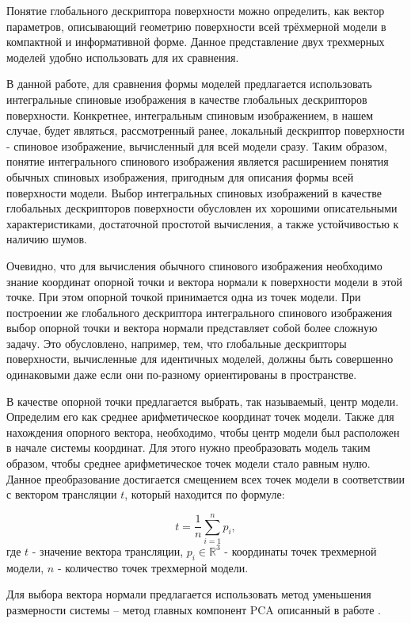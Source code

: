 \documentclass[14pt]{article}
\numberwithin{figure}{section}
\numberwithin{equation}{section}
\begin{document}
Понятие глобального дескриптора поверхности можно определить, как вектор параметров, описывающий геометрию поверхности всей трёхмерной модели в компактной и информативной форме. Данное представление двух трехмерных моделей удобно использовать для их сравнения.

В данной работе, для сравнения формы моделей предлагается использовать интегральные спиновые изображения в качестве глобальных дескрипторов поверхности. Конкретнее, интегральным спиновым изображением, в нашем случае, будет являться, рассмотренный ранее, локальный дескриптор поверхности - спиновое изображение, вычисленный для всей модели сразу. Таким образом, понятие интегрального спинового изображения является расширением понятия обычных спиновых изображения, пригодным для описания формы всей поверхности модели.
Выбор интегральных спиновых изображений в качестве глобальных дескрипторов поверхности обусловлен их хорошими описательными характеристиками, достаточной простотой вычисления, а также устойчивостью к наличию шумов.

Очевидно, что для вычисления обычного спинового изображения необходимо знание координат опорной точки и вектора нормали к поверхности модели в этой точке. При этом опорной точкой принимается одна из точек модели. При построении же глобального дескриптора интегрального спинового изображения выбор опорной точки и вектора нормали представляет собой более сложную задачу. Это обусловлено, например, тем, что глобальные дескрипторы поверхности, вычисленные для идентичных моделей, должны быть совершенно одинаковыми даже если они по-разному ориентированы в пространстве.

В качестве опорной точки предлагается выбрать, так называемый, центр модели. Определим его как среднее арифметическое координат точек модели. Также для нахождения опорного вектора, необходимо, чтобы центр модели был расположен в начале системы координат. Для этого нужно преобразовать модель таким образом, чтобы среднее арифметическое точек модели стало равным нулю. Данное преобразование достигается смещением всех точек модели в соответствии с вектором трансляции $t$, который находится по формуле:

\begin{equation}
	t = \frac{1}{n}\sum\limits^{n}_{i = 1} p_i,
\end{equation}
где $t$ - значение вектора трансляции, $p_i \in \mathbb{R}^3$ - координаты точек трехмерной модели, $n$ - количество точек трехмерной модели.

Для выбора вектора нормали предлагается использовать метод уменьшения размерности системы – метод главных компонент PCA описанный в работе \cite{Chernikoff}.
\end{document}
